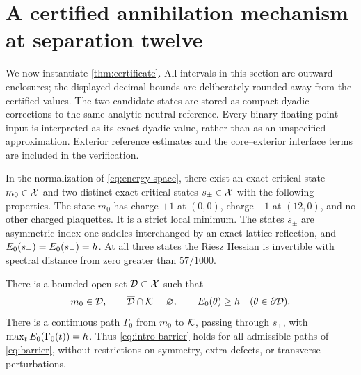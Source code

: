\section{A certified annihilation mechanism at separation twelve}\label{sec:instance}

We now instantiate \cref{thm:certificate}. All intervals in this section are outward enclosures; the displayed decimal bounds are deliberately rounded away from the certified values. The two candidate states are stored as compact dyadic corrections to the same analytic neutral reference. Every binary floating-point input is interpreted as its exact dyadic value, rather than as an unspecified approximation. Exterior reference estimates and the core--exterior interface terms are included in the verification.

\begin{theorem}\label{thm:instance}
In the normalization of \cref{eq:energy-space}, there exist an exact critical state $m_0\in\mathcal X$ and two distinct exact critical states $s_\pm\in\mathcal X$ with the following properties.
The state $m_0$ has charge $+1$ at $(0,0)$, charge $-1$ at $(12,0)$, and no other charged plaquettes. It is a strict local minimum. The states $s_\pm$ are asymmetric index-one saddles interchanged by an exact lattice reflection, and $E_0(s_+)=E_0(s_-)=h$. At all three states the Riesz Hessian is invertible with spectral distance from zero greater than $57/1000$.

There is a bounded open set $\mathcal D\subset\mathcal X$ such that
\begin{equation}\label{eq:separator-instance}
 m_0\in\mathcal D,\qquad
 \overline{\mathcal D}\cap\mathcal K=\varnothing,\qquad
 E_0(\theta)\ge h\quad(\theta\in\partial\mathcal D).
\end{equation}
There is a continuous path $\Gamma_0$ from $m_0$ to $\mathcal K$, passing through $s_+$, with $\max_tE_0(\Gamma_0(t))=h$. Thus \cref{eq:intro-barrier} holds for all admissible paths of \cref{eq:barrier}, without restrictions on symmetry, extra defects, or transverse perturbations.
\end{theorem}

